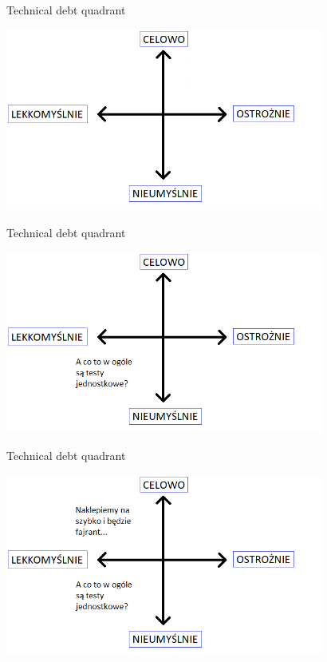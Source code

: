 \documentclass{beamer}
\begin{document}
\begin{frame}{Technical debt quadrant}
\begin{center}
  	\includegraphics[height=6cm]{technical_debt_quadrant2.png}
\end{center}
\end{frame}

\begin{frame}{Technical debt quadrant}
\begin{center}
  	\includegraphics[height=6cm]{technical_debt_quadrant3.png}
\end{center}
\end{frame}

\begin{frame}{Technical debt quadrant}
\begin{center}
  	\includegraphics[height=6cm]{technical_debt_quadrant4.png}
\end{center}
\end{frame}
\end{document}
